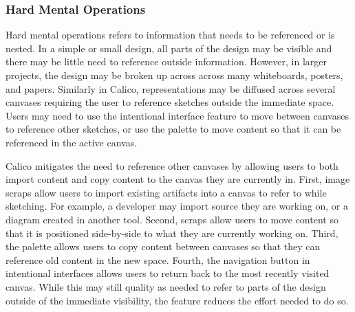 %


\subsubsection{Hard Mental Operations}
Hard mental operations refers to information that needs to be referenced or is nested. In a simple or small design, all parts of the design may be visible and there may be little need to reference outside information. However, in larger projects, the design may be broken up across across many whiteboards, posters, and papers. Similarly in Calico, representations may be diffused across several canvases requiring the user to reference sketches outside the immediate space. Users may need to use the intentional interface feature to move between canvases to reference other sketches, or use the palette to move content so that it can be referenced in the active canvas. 

Calico mitigates the need to reference other canvases by allowing users to both import content and copy content to the canvas they are currently in. First, image scraps allow users to import existing artifacts into a canvas to refer to while sketching. For example, a developer may import source they are working on, or a diagram created in another tool. Second, scraps allow users to move content so that it is positioned side-by-side to what they are currently working on. Third, the palette allows users to copy content between canvases so that they can reference old content in the new space. Fourth, the navigation button in intentional interfaces allows users to return back to the most recently visited canvas. While this may still quality as needed to refer to parts of the design outside of the immediate visibility, the feature reduces the effort needed to do so.


